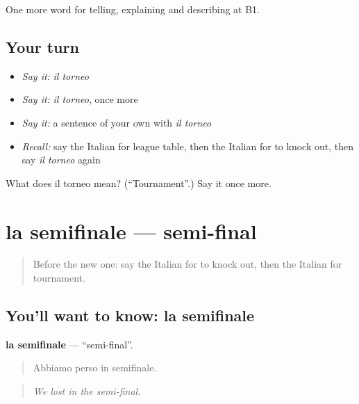 \begin{grammarlens}[title={What you've built}]
One more word for telling, explaining and describing at B1.
\end{grammarlens}

\subsection*{Your turn}
\begin{itemize}
\raggedright
  \item \emph{Say it:} \emph{il torneo}
  \item \emph{Say it:} \emph{il torneo}, once more
  \item \emph{Say it:} a sentence of your own with \emph{il torneo}
  \item \emph{Recall:} say the Italian for league table, then the Italian for to knock out, then say \emph{il torneo} again
\end{itemize}

\begin{tcolorbox}[breakable,colback=teal!4,colframe=teal!35!black,title={Before you move on}]
What does il torneo mean? (\textquotedblleft{}Tournament\textquotedblright{}.) Say it once more.
\end{tcolorbox}
\section[la semifinale]{la semifinale — semi-final}

\label{lesson:IT-C512-semifinale}



\begin{quote}
Before the new one: say the Italian for to knock out, then the Italian for tournament.
\end{quote}

\subsection*{You'll want to know: la semifinale}
\textbf{la semifinale} — \textquotedblleft{}semi-final\textquotedblright{}.

\begin{quote}
Abbiamo perso in semifinale.
\end{quote}

\begin{quote}
\emph{We lost in the semi-final.}
\end{quote}

